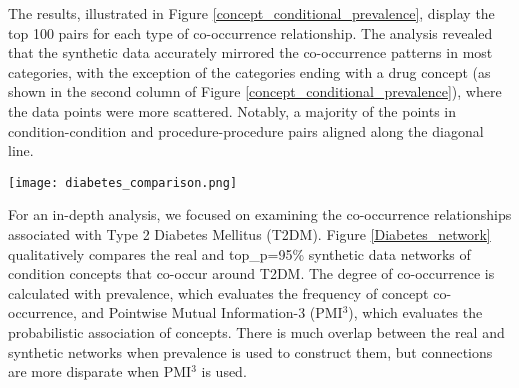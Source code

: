 \begin{multicols}{2}
The results, illustrated in Figure \ref{concept_conditional_prevalence}, display the top 100 pairs for each type of co-occurrence relationship. The analysis revealed that the synthetic data accurately mirrored the co-occurrence patterns in most categories, with the exception of the categories ending with a drug concept (as shown in the second column of Figure \ref{concept_conditional_prevalence}), where the data points were more scattered. Notably, a majority of the points in condition-condition and procedure-procedure pairs aligned along the diagonal line.

\begin{Figure}
    \texttt{[image: diabetes\_comparison.png]}
    \label{Diabetes_network}
\end{Figure}

For an in-depth analysis, we focused on examining the co-occurrence relationships associated with Type 2 Diabetes Mellitus (T2DM). Figure \ref{Diabetes_network} qualitatively compares the real and top\_p=95\% synthetic data networks of condition concepts that co-occur around T2DM. The degree of co-occurrence is calculated with prevalence, which evaluates the frequency of concept co-occurrence, and Pointwise Mutual Information-3 (PMI$^3$), which evaluates the probabilistic association of concepts. There is much overlap between the real and synthetic networks when prevalence is used to construct them, but connections are more disparate when PMI$^3$ is used. 


\end{multicols}
